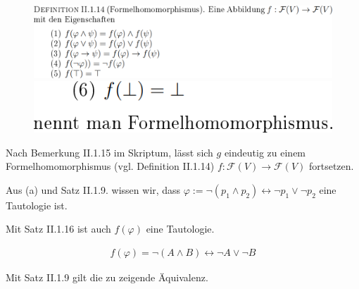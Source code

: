 \begin{solution}
\begin{enumerate}[label = \alph*.]
    \begin{figure}[h!]
        \begin{boxedin}
            \begin{center}
                \includegraphics[width = 0.75 \textwidth]{../../../Fundament-LaTeX/images/LGM/LGM - Definition II.1.14.1 (Formelhomomorphismus).png} \\
                \includegraphics[width = 0.125 \textwidth]{../../../Fundament-LaTeX/images/LGM/LGM - Definition II.1.14.2 (Formelhomomorphismus).png}
            \end{center}
        \end{boxedin}
    \end{figure}

    Nach Bemerkung II.1.15 im Skriptum, lässt sich $g$ eindeutig zu einem Formelhomomorphismus (vgl. Definition II.1.14) $f:\mathcal{F}(V) \to \mathcal{F}(V)$ fortsetzen.


    Aus (a) und Satz II.1.9. wissen wir, dass $\varphi := \neg (p_1 \land p_2) \leftrightarrow \neg p_1 \lor \neg p_2$ eine Tautologie ist.


    Mit Satz II.1.16 ist auch $f(\varphi)$ eine Tautologie.

    \begin{align*}
        f(\varphi) = \neg (A \land B) \leftrightarrow \neg A \lor \neg B
    \end{align*}

    Mit Satz II.1.9 gilt die zu zeigende Äquivalenz.

\end{enumerate}

\end{solution}

